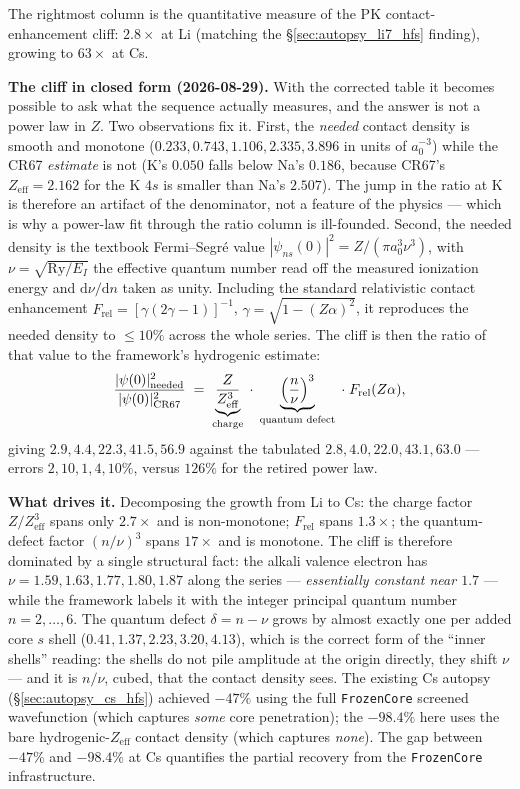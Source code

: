 \documentclass[11pt]{article}
\begin{document}
The rightmost column is the quantitative measure of the PK
contact-enhancement cliff: $2.8\times$ at Li (matching the
\S\ref{sec:autopsy_li7_hfs} finding), growing to $63\times$ at Cs.

\textbf{The cliff in closed form (2026-08-29).}  With the corrected
table it becomes possible to ask what the sequence actually measures,
and the answer is not a power law in $Z$.  Two observations fix it.
First, the \emph{needed} contact density is smooth and monotone
($0.233, 0.743, 1.106, 2.335, 3.896$ in units of $a_0^{-3}$) while the
CR67 \emph{estimate} is not (K's $0.050$ falls below Na's $0.186$,
because CR67's $Z_\text{eff} = 2.162$ for the K $4s$ is smaller than
Na's $2.507$).  The jump in the ratio at K is therefore an artifact of
the denominator, not a feature of the physics --- which is why a
power-law fit through the ratio column is ill-founded.
Second, the needed density is the textbook Fermi--Segr\'e value
$|\psi_{ns}(0)|^2 = Z/(\pi a_0^3 \nu^3)$, with $\nu = \sqrt{\mathrm{Ry}/E_I}$
the effective quantum number read off the measured ionization energy
and $\mathrm{d}\nu/\mathrm{d}n$ taken as unity.  Including the standard
relativistic contact enhancement $F_\text{rel} = [\gamma(2\gamma-1)]^{-1}$,
$\gamma = \sqrt{1-(Z\alpha)^2}$, it reproduces the needed density to
$\leq 10\%$ across the whole series.  The cliff is then the ratio of
that value to the framework's hydrogenic estimate:
\begin{equation}\label{eq:alkali_cliff}
  \frac{|\psi(0)|^2_\text{needed}}{|\psi(0)|^2_\text{CR67}}
  \;=\; \underbrace{\frac{Z}{Z_\text{eff}^3}}_{\text{charge}}
  \;\cdot\; \underbrace{\Bigl(\frac{n}{\nu}\Bigr)^{3}}_{\text{quantum defect}}
  \;\cdot\; F_\text{rel}(Z\alpha),
\end{equation}
giving $2.9, 4.4, 22.3, 41.5, 56.9$ against the tabulated
$2.8, 4.0, 22.0, 43.1, 63.0$ --- errors $2, 10, 1, 4, 10\%$, versus
$126\%$ for the retired power law.

\textbf{What drives it.}  Decomposing the growth from Li to Cs: the
charge factor $Z/Z_\text{eff}^3$ spans only $2.7\times$ and is
non-monotone; $F_\text{rel}$ spans $1.3\times$; the quantum-defect
factor $(n/\nu)^3$ spans $17\times$ and is monotone.  The cliff is
therefore dominated by a single structural fact: the alkali valence
electron has $\nu = 1.59, 1.63, 1.77, 1.80, 1.87$ along the series ---
\emph{essentially constant near $1.7$} --- while the framework labels
it with the integer principal quantum number $n = 2,\ldots,6$.  The
quantum defect $\delta = n - \nu$ grows by almost exactly one per added
core $s$ shell ($0.41, 1.37, 2.23, 3.20, 4.13$), which is the
correct form of the ``inner shells'' reading: the shells do not pile
amplitude at the origin directly, they shift $\nu$ --- and it is $n/\nu$,
cubed, that the contact density sees.  The existing Cs
autopsy (\S\ref{sec:autopsy_cs_hfs}) achieved $-47\%$ using the full
\texttt{FrozenCore} screened wavefunction (which captures \emph{some}
core penetration); the $-98.4\%$ here uses the bare
hydrogenic-$Z_\text{eff}$ contact density (which captures \emph{none}).
The gap between $-47\%$ and $-98.4\%$ at Cs quantifies the partial
recovery from the \texttt{FrozenCore} infrastructure.
\end{document}
